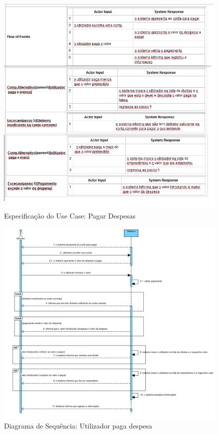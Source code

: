 \begin{figure}[htb!]
	\centering
	\includegraphics[scale=0.6]{imagens/Especificacoes/pagardespesas}  
	\caption{Especificação do Use Case: Pagar Despesas}  
\end{figure}


\begin{figure}[htb!]
	\centering
	\includegraphics[scale=0.6]{imagens/DiagramaSeq/PagarDespesa}  
	\caption{Diagrama de Sequência: Utilizador paga despesa}  
\end{figure}



